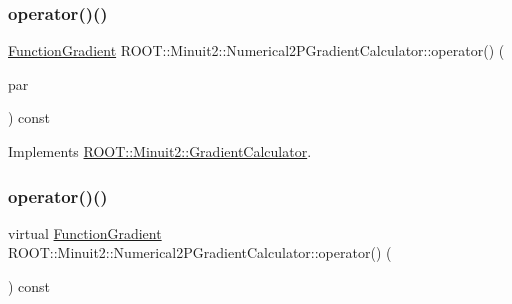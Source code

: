 \mbox{\label{classROOT_1_1Minuit2_1_1Numerical2PGradientCalculator_a40aca4ad0b9583062fc830c359140b43}} 
\subsubsection{\texorpdfstring{operator()()}{operator()()}\hspace{0.1cm}{\footnotesize\ttfamily [1/9]}}
{\footnotesize\ttfamily \mbox{\hyperlink{classROOT_1_1Minuit2_1_1FunctionGradient}{Function\+Gradient}} R\+O\+O\+T\+::\+Minuit2\+::\+Numerical2\+P\+Gradient\+Calculator\+::operator() (\begin{DoxyParamCaption}\item[{const \mbox{\hyperlink{classROOT_1_1Minuit2_1_1MinimumParameters}{Minimum\+Parameters}} \&}]{par }\end{DoxyParamCaption}) const\hspace{0.3cm}{\ttfamily [virtual]}}



Implements \mbox{\hyperlink{classROOT_1_1Minuit2_1_1GradientCalculator_a1bae913e96ffc9ece28664a5f6f79cb0}{R\+O\+O\+T\+::\+Minuit2\+::\+Gradient\+Calculator}}.

\mbox{\label{classROOT_1_1Minuit2_1_1Numerical2PGradientCalculator_a8c90cd467631ecc4cac72187de948b05}} 
\subsubsection{\texorpdfstring{operator()()}{operator()()}\hspace{0.1cm}{\footnotesize\ttfamily [2/9]}}
{\footnotesize\ttfamily virtual \mbox{\hyperlink{classROOT_1_1Minuit2_1_1FunctionGradient}{Function\+Gradient}} R\+O\+O\+T\+::\+Minuit2\+::\+Numerical2\+P\+Gradient\+Calculator\+::operator() (\begin{DoxyParamCaption}\item[{const \mbox{\hyperlink{classROOT_1_1Minuit2_1_1MinimumParameters}{Minimum\+Parameters}} \&}]{ }\end{DoxyParamCaption}) const\hspace{0.3cm}{\ttfamily [virtual]}}



